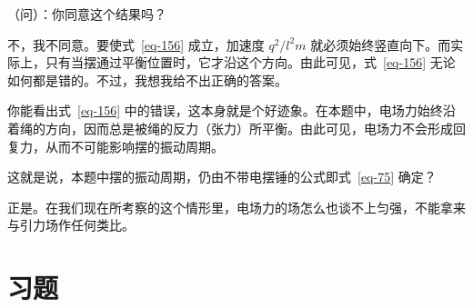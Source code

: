 \begin{dialogue}
\tchr （问）：你同意这个结果吗？

\stdb 不，我不同意。要使式~\eqref{eq-156} 成立，加速度 $q^{2}/l^{2}m$ 就必须始终竖直向下。而实际上，只有当摆通过平衡位置时，它才沿这个方向。由此可见，式~\eqref{eq-156} 无论如何都是错的。不过，我想我给不出正确的答案。

\tchr 你能看出式~\eqref{eq-156} 中的错误，这本身就是个好迹象。在本题中，电场力始终沿着绳的方向，因而总是被绳的反力（张力）所平衡。由此可见，电场力不会形成回复力，从而不可能影响摆的振动周期。

\stdb 这就是说，本题中摆的振动周期，仍由不带电摆锤的公式即式~\eqref{eq-75} 确定？

\tchr 正是。在我们现在所考察的这个情形里，电场力的场怎么也谈不上匀强，不能拿来与引力场作任何类比。

\end{dialogue}

\section*{习题}
\label{prob-25}

